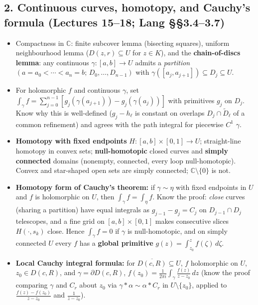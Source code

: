 \documentclass[12pt, reqno]{amsart}
\theoremstyle{definition}
\numberwithin{equation}{subsection}
\newcommand{\C}{\mathbb{C}}
\newcommand{\ov}[1]{\overline{#1}}
\begin{document}
\subsection*{2. Continuous curves, homotopy, and Cauchy's formula \normalfont (Lectures 15--18; Lang \S\S3.4--3.7)}
\begin{itemize}[leftmargin=*]
\item Compactness in $\C$: finite subcover lemma (bisecting squares), uniform neighbourhood lemma ($D(z,r)\subseteq U$ for $z\in K$),
      and the \textbf{chain-of-discs lemma}: any continuous $\gamma:[a,b]\to U$ admits a \emph{partition}
      $(a=a_0<\cdots<a_n=b;\,D_0,\dots,D_{n-1})$ with $\gamma([a_j,a_{j+1}])\subseteq D_j\subseteq U$.
\item For holomorphic $f$ and continuous $\gamma$, set $\int_\gamma f=\sum_{j=0}^{n-1}[g_j(\gamma(a_{j+1}))-g_j(\gamma(a_j))]$ with primitives $g_j$ on $D_j$.
      Know why this is well-defined ($g_j-h_\ell$ is constant on overlaps
      $D_j\cap\widetilde D_\ell$ of a common refinement) and agrees with the path integral for piecewise $C^1$ $\gamma$.
\item \textbf{Homotopy with fixed endpoints} $H:[a,b]\times[0,1]\to U$; straight-line homotopy in convex sets;
      \textbf{null-homotopic} closed curves and \textbf{simply connected} domains (nonempty, connected, every loop null-homotopic).
      Convex and star-shaped open sets are simply connected; $\C\setminus\{0\}$ is not.
\item \textbf{Homotopy form of Cauchy's theorem:} if $\gamma\sim\eta$ with fixed endpoints in $U$ and $f$ is holomorphic on $U$,
      then $\int_\gamma f=\int_\eta f$. Know the proof: \emph{close} curves (sharing a partition) have equal integrals as $g_{j-1}-g_j=C_j$
      on $D_{j-1}\cap D_j$ telescopes, and a fine grid on $[a,b]\times[0,1]$ makes consecutive slices $H(\cdot,s_k)$ close.
      Hence $\int_\gamma f=0$ if $\gamma$ is null-homotopic, and on simply connected $U$ every $f$ has a
      \textbf{global primitive} $g(z)=\int_{z_0}^z f(\zeta)\,d\zeta$.
\item \textbf{Local Cauchy integral formula:} for $\ov{D(c,R)}\subseteq U$, $f$ holomorphic on $U$, $z_0\in D(c,R)$, and $\gamma=\partial D(c,R)$,
      $f(z_0)=\frac{1}{2\pi i}\int_\gamma\frac{f(z)}{z-z_0}\,dz$
      (know the proof comparing $\gamma$ and $C_r$ about $z_0$ via $\gamma*\alpha\sim\alpha*C_r$ in $U\setminus\{z_0\}$, applied to $\frac{f(z)-f(z_0)}{z-z_0}$ and $\frac{1}{z-z_0}$).
\end{itemize}
\end{document}
